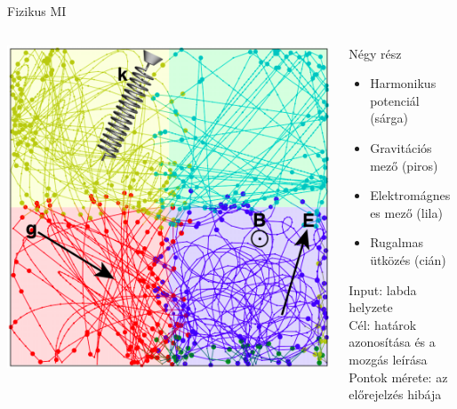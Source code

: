 \begin{frame}{Fizikus MI}
    \begin{columns}
        \begin{column}{0.45\textwidth}
            \centering
            \includegraphics[width=1.0\textwidth]{figures/ai_phys_mystery_world.png}
        \end{column}
        \begin{column}{0.45\textwidth}
            Négy rész
            \begin{itemize}
                \item Harmonikus potenciál (sárga)
                \item Gravitációs mező (piros)
                \item Elektromágneses mező (lila)
                \item Rugalmas ütközés (cián)
            \end{itemize}
            Input: labda helyzete \\
            Cél: határok azonosítása és a mozgás leírása \\
            Pontok mérete: az előrejelzés hibája
        \end{column}
    \end{columns}
\end{frame}

